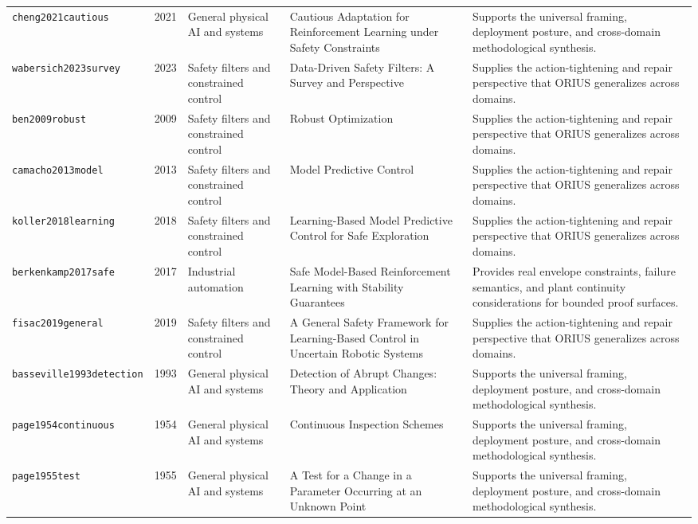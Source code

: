 \begin{longtable}{p{}p{}p{}p{}p{}}
\texttt{cheng2021cautious} & 2021 & General physical AI and systems & Cautious Adaptation for Reinforcement Learning under Safety Constraints & Supports the universal framing, deployment posture, and cross-domain methodological synthesis.\\
\texttt{wabersich2023survey} & 2023 & Safety filters and constrained control & Data-Driven Safety Filters: A Survey and Perspective & Supplies the action-tightening and repair perspective that ORIUS generalizes across domains.\\
\texttt{ben2009robust} & 2009 & Safety filters and constrained control & Robust Optimization & Supplies the action-tightening and repair perspective that ORIUS generalizes across domains.\\
\texttt{camacho2013model} & 2013 & Safety filters and constrained control & Model Predictive Control & Supplies the action-tightening and repair perspective that ORIUS generalizes across domains.\\
\texttt{koller2018learning} & 2018 & Safety filters and constrained control & Learning-Based Model Predictive Control for Safe Exploration & Supplies the action-tightening and repair perspective that ORIUS generalizes across domains.\\
\texttt{berkenkamp2017safe} & 2017 & Industrial automation & Safe Model-Based Reinforcement Learning with Stability Guarantees & Provides real envelope constraints, failure semantics, and plant continuity considerations for bounded proof surfaces.\\
\texttt{fisac2019general} & 2019 & Safety filters and constrained control & A General Safety Framework for Learning-Based Control in Uncertain Robotic Systems & Supplies the action-tightening and repair perspective that ORIUS generalizes across domains.\\
\texttt{basseville1993detection} & 1993 & General physical AI and systems & Detection of Abrupt Changes: Theory and Application & Supports the universal framing, deployment posture, and cross-domain methodological synthesis.\\
\texttt{page1954continuous} & 1954 & General physical AI and systems & Continuous Inspection Schemes & Supports the universal framing, deployment posture, and cross-domain methodological synthesis.\\
\texttt{page1955test} & 1955 & General physical AI and systems & A Test for a Change in a Parameter Occurring at an Unknown Point & Supports the universal framing, deployment posture, and cross-domain methodological synthesis.\\

\end{longtable}
